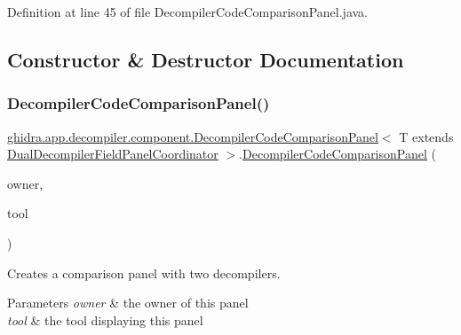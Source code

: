 Definition at line 45 of file Decompiler\+Code\+Comparison\+Panel.\+java.



\subsection{Constructor \& Destructor Documentation}
\mbox{\label{classghidra_1_1app_1_1decompiler_1_1component_1_1_decompiler_code_comparison_panel_aae6c0226bf57a6a1dd32722b11d8c973}} 
\subsubsection{\texorpdfstring{DecompilerCodeComparisonPanel()}{DecompilerCodeComparisonPanel()}}
{\footnotesize\ttfamily \mbox{\hyperlink{classghidra_1_1app_1_1decompiler_1_1component_1_1_decompiler_code_comparison_panel}{ghidra.\+app.\+decompiler.\+component.\+Decompiler\+Code\+Comparison\+Panel}}$<$ T extends \mbox{\hyperlink{classghidra_1_1app_1_1decompiler_1_1component_1_1_dual_decompiler_field_panel_coordinator}{Dual\+Decompiler\+Field\+Panel\+Coordinator}} $>$.\mbox{\hyperlink{classghidra_1_1app_1_1decompiler_1_1component_1_1_decompiler_code_comparison_panel}{Decompiler\+Code\+Comparison\+Panel}} (\begin{DoxyParamCaption}\item[{String}]{owner,  }\item[{Plugin\+Tool}]{tool }\end{DoxyParamCaption})\hspace{0.3cm}{\ttfamily [inline]}}

Creates a comparison panel with two decompilers. 
\begin{DoxyParams}{Parameters}
{\em owner} & the owner of this panel \\
\hline
{\em tool} & the tool displaying this panel \\
\hline
\end{DoxyParams}


